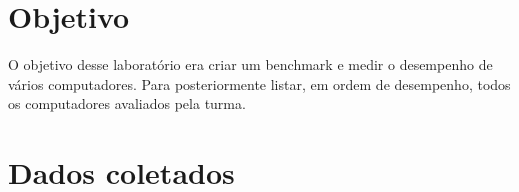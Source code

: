 \documentclass[10pt,a4paper]{article}
\begin{document}
\setlength{\parskip}{0pt}
\setlength{\parsep}{0pt}
\setlength{\headsep}{0pt}
\setlength{\topskip}{0pt}
\setlength{\topmargin}{0pt}
\setlength{\topsep}{0pt}
\setlength{\partopsep}{0pt}


\begin{minipage}{5cm}
  \vspace{2mm}
\end{minipage}


\section{Objetivo}
O objetivo desse laboratório era criar um benchmark e medir o desempenho de vários computadores.
Para posteriormente listar, em ordem de desempenho, todos os computadores avaliados pela turma.
\section{Dados coletados}
\end{document}
